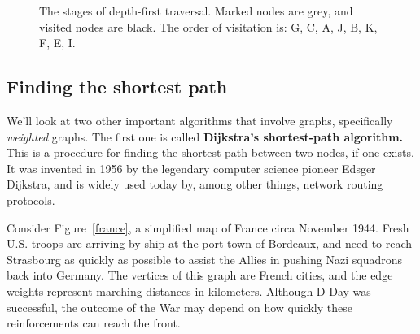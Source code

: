 \begin{figure}[ht]
\begin{custommargins}{-1.4cm}{-1.8cm}
{{
    }
  }
\caption{The stages of depth-first traversal. Marked nodes are grey, and
visited nodes are black. The order of visitation is: G, C, A, J, B, K, F,
E, I.}
\label{DFT}
\end{custommargins}
\end{figure}

\subsection{Finding the shortest path}

We'll look at two other important algorithms that involve graphs,
specifically \textit{weighted} graphs. The first one is called
\textbf{Dijkstra's shortest-path algorithm.} This is a procedure for
finding the shortest path between two nodes, if one exists. It was invented
in 1956 by the legendary computer science pioneer Edsger Dijkstra, and is
widely used today by, among other things, network routing protocols.

Consider Figure~\ref{france}, a simplified map of France circa November
1944. Fresh U.S. troops are arriving by ship at the port town of Bordeaux,
and need to reach Strasbourg as quickly as possible to assist the Allies in
pushing Nazi squadrons back into Germany. The vertices of this graph are
French cities, and the edge weights represent marching distances in
kilometers. Although D-Day was successful, the outcome of the War may
depend on how quickly these reinforcements can reach the front.

